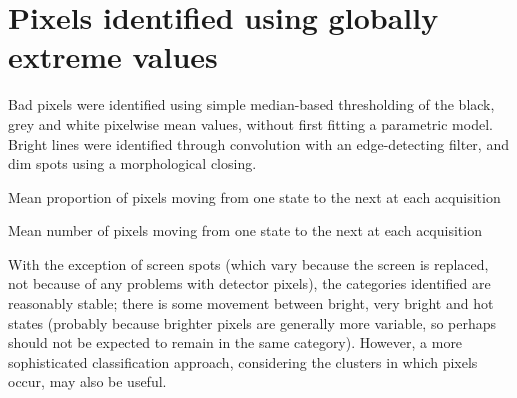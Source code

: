 \documentclass[10pt,fleqn]{article}
\begin{document}
\section{Pixels identified using globally extreme values}

Bad pixels were identified using simple median-based thresholding of the black, grey and white pixelwise mean values, without first fitting a parametric model. Bright lines were identified through convolution with an edge-detecting filter, and dim spots using a morphological closing.

\begin{table}[!ht]
\caption{Mean proportion of pixels moving from one state to the next at each acquisition}

		

\end{table}

\begin{table}[!ht]
\caption{Mean number of pixels moving from one state to the next at each acquisition}

		

\end{table}

With the exception of screen spots (which vary because the screen is replaced, not because of any problems with detector pixels), the categories identified are reasonably stable; there is some movement between bright, very bright and hot states (probably because brighter pixels are generally more variable, so perhaps should not be expected to remain in the same category). However, a more sophisticated classification approach, considering the clusters in which pixels occur, may also be useful.
\end{document}
